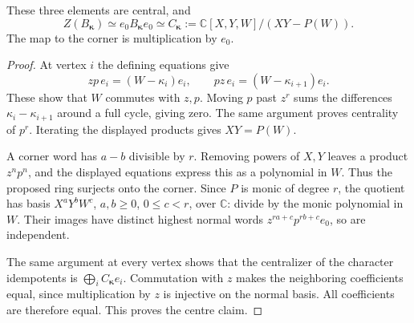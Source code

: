 \begin{theorem}\label{thm:cs-cyclic-centre}
These three elements are central, and
\[
 Z(B_{\boldsymbol\kappa})
 \simeq e_0B_{\boldsymbol\kappa}e_0
 \simeq C_{\boldsymbol\kappa}
 :=\mathbb C[X,Y,W]/(XY-P(W)).
\]
The map to the corner is multiplication by \(e_0\).
\end{theorem}
\begin{proof}
At vertex \(i\) the defining equations give
\[
 zp\,e_i=(W-\kappa_i)e_i,\qquad
 pz\,e_i=(W-\kappa_{i+1})e_i.
\]
These show that \(W\) commutes with \(z,p\).
Moving \(p\) past \(z^r\) sums the differences
\(\kappa_i-\kappa_{i+1}\) around a full cycle, giving zero.
The same argument proves centrality of \(p^r\).
Iterating the displayed products gives \(XY=P(W)\).

A corner word has \(a-b\) divisible by \(r\). Removing powers
of \(X,Y\) leaves a product \(z^np^n\), and the displayed equations
express this as a polynomial in \(W\). Thus the proposed ring
surjects onto the corner. Since \(P\) is monic of degree \(r\),
the quotient has basis \(X^aY^bW^c\), \(a,b\geq0\), \(0\leq c<r\),
over \(\mathbb C\): divide by the monic polynomial in \(W\).
Their images have distinct highest normal words
\(z^{ra+c}p^{rb+c}e_0\), so are independent.

The same argument at every vertex shows that the centralizer of
the character idempotents is \(\bigoplus_i C_{\boldsymbol\kappa}e_i\).
Commutation with \(z\) makes the neighboring coefficients equal,
since multiplication by \(z\) is injective on the normal basis.
All coefficients are therefore equal. This proves the centre claim.
\end{proof}

